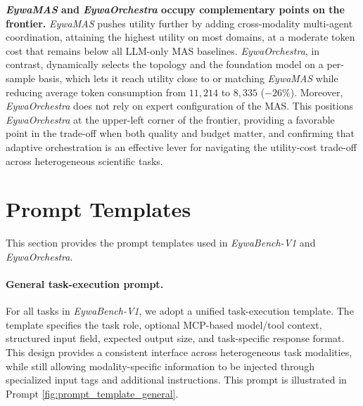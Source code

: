 \documentclass{llmxive}
\begin{document}
{\textbf{\textit{EywaMAS} and \textit{EywaOrchestra} occupy complementary points on the frontier.} \textit{EywaMAS} pushes utility further by adding cross-modality multi-agent coordination, attaining the highest utility on most domains, at a moderate token cost that remains below all LLM-only MAS baselines. \textit{EywaOrchestra}, in contrast, dynamically selects the topology and the foundation model on a per-sample basis, which lets it reach utility close to or matching \textit{EywaMAS} while reducing average token consumption from $11{,}214$ to $8{,}335$ ($-26\%$). Moreover, \textit{EywaOrchestra} does not rely on expert configuration of the MAS. This positions \textit{EywaOrchestra} at the upper-left corner of the frontier, providing a favorable point in the trade-off when both quality and budget matter, and confirming that adaptive orchestration is an effective lever for navigating the utility-cost trade-off across heterogeneous scientific tasks.





\section{Prompt Templates}
\label{app:prompts}

This section provides the prompt templates used in \textit{EywaBench-V1} and \textit{EywaOrchestra}. 

\paragraph{General task-execution prompt.}
For all tasks in \textit{EywaBench-V1}, we adopt a unified task-execution template. The template specifies the task role, optional MCP-based model/tool context, structured input field, expected output size, and task-specific response format. This design provides a consistent interface across heterogeneous task modalities, while still allowing modality-specific information to be injected through specialized input tags and additional instructions. This prompt is illustrated in Prompt \ref{fig:prompt_template_general}.

}
\end{document}
